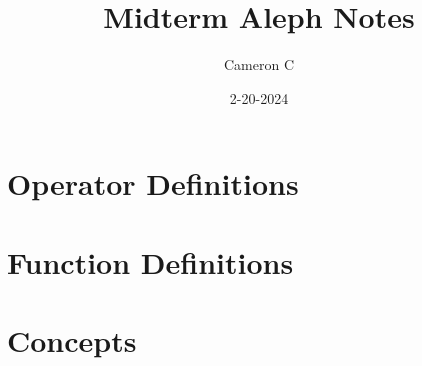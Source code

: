 \documentclass[12pt, letterpaper, fleqn]{article}
\title{Midterm Aleph Notes}
\author{Cameron C}
\date{2-20-2024}
\begin{document}
\maketitle

\section*{Operator Definitions}

\section*{Function Definitions}


\section*{Concepts}

\end{document}
